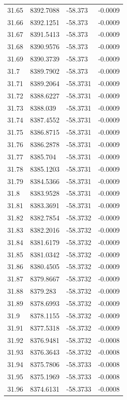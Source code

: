 \begin{table}[H]
\begin{tabular}{llll}
31.65 & 8392.7088 & -58.373 & -0.0009 \\
31.66 & 8392.1251 & -58.373 & -0.0009 \\
31.67 & 8391.5413 & -58.373 & -0.0009 \\
31.68 & 8390.9576 & -58.373 & -0.0009 \\
31.69 & 8390.3739 & -58.373 & -0.0009 \\
31.7 & 8389.7902 & -58.373 & -0.0009 \\
31.71 & 8389.2064 & -58.3731 & -0.0009 \\
31.72 & 8388.6227 & -58.3731 & -0.0009 \\
31.73 & 8388.039 & -58.3731 & -0.0009 \\
31.74 & 8387.4552 & -58.3731 & -0.0009 \\
31.75 & 8386.8715 & -58.3731 & -0.0009 \\
31.76 & 8386.2878 & -58.3731 & -0.0009 \\
31.77 & 8385.704 & -58.3731 & -0.0009 \\
31.78 & 8385.1203 & -58.3731 & -0.0009 \\
31.79 & 8384.5366 & -58.3731 & -0.0009 \\
31.8 & 8383.9528 & -58.3731 & -0.0009 \\
31.81 & 8383.3691 & -58.3731 & -0.0009 \\
31.82 & 8382.7854 & -58.3732 & -0.0009 \\
31.83 & 8382.2016 & -58.3732 & -0.0009 \\
31.84 & 8381.6179 & -58.3732 & -0.0009 \\
31.85 & 8381.0342 & -58.3732 & -0.0009 \\
31.86 & 8380.4505 & -58.3732 & -0.0009 \\
31.87 & 8379.8667 & -58.3732 & -0.0009 \\
31.88 & 8379.283 & -58.3732 & -0.0009 \\
31.89 & 8378.6993 & -58.3732 & -0.0009 \\
31.9 & 8378.1155 & -58.3732 & -0.0009 \\
31.91 & 8377.5318 & -58.3732 & -0.0009 \\
31.92 & 8376.9481 & -58.3732 & -0.0008 \\
31.93 & 8376.3643 & -58.3732 & -0.0008 \\
31.94 & 8375.7806 & -58.3733 & -0.0008 \\
31.95 & 8375.1969 & -58.3733 & -0.0008 \\
31.96 & 8374.6131 & -58.3733 & -0.0008 \\

\end{tabular}
\end{table}
